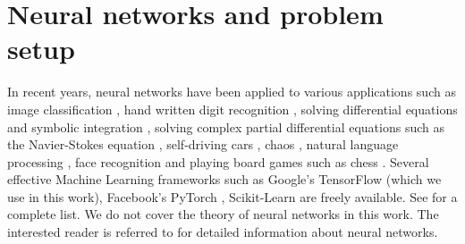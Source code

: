 \documentclass[12pt]{article}
\begin{document}
\section{Neural networks and problem setup}
In recent years, neural networks have been applied to various applications such as image classification \cite{paper:hinton2017}, hand written digit recognition \cite{paper:kulkarni2018}, solving differential equations and symbolic integration \cite{misc:lample2019}, solving complex partial differential equations such as the Navier-Stokes equation \cite{misc:anandkumar2020}, self-driving cars \cite{misc:agnihotri2019,misc:nvidiaselfdriving2016}, chaos \cite{paper:pathak2018}, natural language processing \cite{misc:googlenlp}, face recognition \cite{conf:taigman2014} and playing board games such as chess \cite{paper:alphazero}. Several effective Machine Learning frameworks such as Google's TensorFlow \cite{misc:tensorflow} (which we use in this work), Facebook's PyTorch \cite{incollect:pytorch}, Scikit-Learn \cite{paper:scikit-learn} are freely available. See \cite{misc:compdeep} for a complete list. We do not cover the theory of neural networks in this work. The interested reader is referred to \cite{book:aggarwal,book:goodfellow,book:chollet,misc:cs231n,misc:andrewng,misc:udemy} for detailed information about neural networks.
\end{document}

